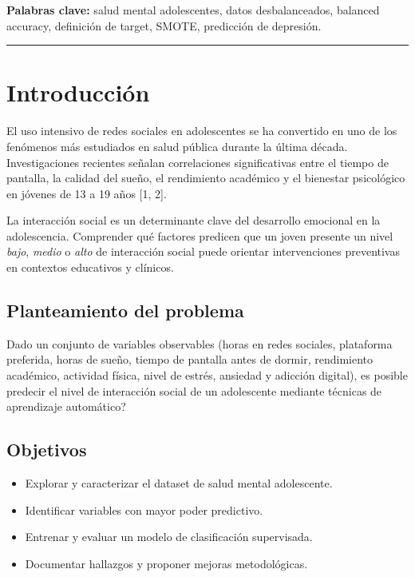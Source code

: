 \documentclass[11pt,twocolumn]{article}
\begin{document}
\textbf{Palabras clave:} salud mental adolescentes, datos desbalanceados,
balanced accuracy, definici\'on de target, SMOTE, predicci\'on de depresi\'on.

\vspace{6pt}
\noindent\textcolor{galileoblue}{\rule{\linewidth}{0.6pt}}
\vspace{2pt}

\section{Introducci\'on}

El uso intensivo de redes sociales en adolescentes se ha convertido en
uno de los fen\'omenos m\'as estudiados en salud p\'ublica durante la
\'ultima d\'ecada. Investigaciones recientes se\~nalan correlaciones
significativas entre el tiempo de pantalla, la calidad del sue\~no, el
rendimiento acad\'emico y el bienestar psicol\'ogico en j\'ovenes de 13 a
19 a\~nos [1, 2].

La interacci\'on social es un determinante clave del desarrollo emocional
en la adolescencia. Comprender qu\'e factores predicen que un joven presente
un nivel \textit{bajo}, \textit{medio} o \textit{alto} de interacci\'on
social puede orientar intervenciones preventivas en contextos educativos
y cl\'inicos.

\subsection{Planteamiento del problema}

Dado un conjunto de variables observables (horas en redes sociales,
plataforma preferida, horas de sue\~no, tiempo de pantalla antes de dormir,
rendimiento acad\'emico, actividad f\'isica, nivel de estr\'es, ansiedad y
adicci\'on digital), \textquestiondown es posible predecir el nivel de
interacci\'on social de un adolescente mediante t\'ecnicas de aprendizaje
autom\'atico?

\subsection{Objetivos}

\begin{itemize}[leftmargin=12pt, itemsep=0pt, parsep=2pt]
  \item Explorar y caracterizar el dataset de salud mental adolescente.
  \item Identificar variables con mayor poder predictivo.
  \item Entrenar y evaluar un modelo de clasificaci\'on supervisada.
  \item Documentar hallazgos y proponer mejoras metodol\'ogicas.
\end{itemize}
\end{document}
